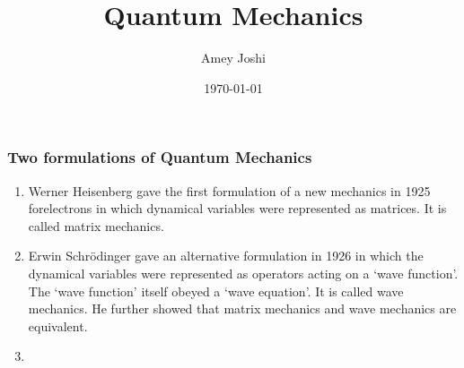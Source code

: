 \documentclass{beamer}
\title{Quantum Mechanics}
\author{Amey Joshi}
\date{\today}
\begin{document}
\begin{frame}
\titlepage
\end{frame}

\begin{frame}
\frametitle{Two formulations of Quantum Mechanics}
\begin{enumerate}
\item Werner Heisenberg gave the first formulation of a new mechanics in 1925 
forelectrons in which dynamical variables were represented as matrices. It is 
called matrix mechanics.
\item Erwin Schr\"{o}dinger gave an alternative formulation in 1926 in which
the dynamical variables were represented as operators acting on a `wave 
function'. The `wave function' itself obeyed a `wave equation'. It is called
wave mechanics. He further showed that matrix mechanics and wave mechanics are
equivalent.
\item 
\end{enumerate}
\end{frame}
\end{document}
